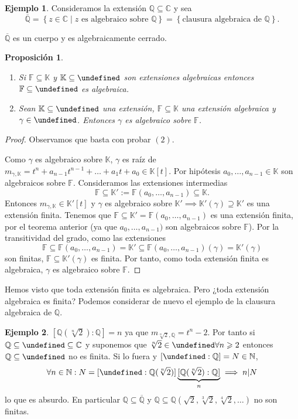 \documentclass[10pt, spanish]{report}
\newtheorem*{prop}{Proposición}
\theoremstyle{definition}
\newtheorem*{ej}{Ejemplo}
\newcommand{\N}{\mathbb{N}}
\newcommand{\Q}{\mathbb{Q}}
\newcommand{\C}{\mathbb{C}}
\newcommand{\F}{\mathbb{F}}
\newcommand{\K}{\mathbb{K}}
\let\L\undefined
\newcommand{\L}{\mathbb{L}}
\renewcommand{\geq}{\geqslant}
\newcommand{\fecha}[1]{\marginpar{\underline{#1}}}
\begin{document}
\begin{ej}
    Consideramos la extensión $\Q\subseteq\C$ y sea \[\overline{\Q}=\left\{ z\in
    \C\mid z\text{ es algebraico sobre }\Q\right\}=\left\{ \text{clausura
    algebraica de }\Q\right\}.\]

    $\overline{\Q}$ es un cuerpo y es algebraicamente cerrado.
\end{ej}

\fecha{2/03}
\begin{prop}\hspace{0pt}
    \begin{enumerate}
        \item Si $\F\subseteq\K$ y $\K\subseteq\L$ son extensiones algebraicas entonces
    $\F\subseteq\L$ es algebraica.
        \item Sean $\K\subseteq\L$ una extensión, $\F\subseteq\K$ una extensión
            algebraica y $\gamma\in\L$. Entonces $\gamma$ es algebraico sobre
            $\F$.
    \end{enumerate}
\end{prop}

\begin{proof}
        Observamos que basta con probar $(2)$.

        Como $\gamma$ es algebraico sobre $\K$, $\gamma$ es raíz de
        $m_{\gamma,\K}=t^n+a_{n-1}t^{n-1}+\ldots+a_1t+a_0\in\K[t]$. Por
        hipótesis $a_0,\ldots,a_{n-1}\in \K$ son algebraicos sobre $\F$.
        Consideramos las extensiones intermedias
        \[\F\subseteq\K':=\F(a_0,\ldots,a_{n-1})\subseteq\K.\]
        Entonces $m_{\gamma,\K}\in \K'[t]$ y $\gamma$  es
        algebraico sobre $\K' \implies \K'(\gamma)\supseteq \K'$ es una
        extensión finita. Tenemos que $\F\subseteq\K'=\F(a_0,\ldots,a_{n-1})$ es
        una extensión finita, por el teorema anterior (ya que
        $a_0,\ldots,a_{n-1})$ son algebraicos sobre $\F$). Por la transitividad
        del grado, como las extensiones
        \[\F\subseteq\F(a_0,\ldots,a_{n-1})=\K'\subseteq\F(a_0,\ldots,a_{n-1})(\gamma)=\K'(\gamma)\]
        son finitas, $\F\subseteq\K'(\gamma)$ es finita. Por tanto, como toda
        extensión finita es algebraica, $\gamma$ es algebraico sobre $\F$.
\end{proof}

Hemos visto que toda extensión finita es algebraica. Pero ¿toda extensión
algebraica es finita? Podemos considerar de nuevo el ejemplo de la clausura
algebraica de $\Q$.

\begin{ej}
    $[\Q(\sqrt[n]{2}):\Q]=n$ ya que $m_{\sqrt[n]{2} ,\Q}=t^n-2$. Por tanto si
    $\Q\subseteq\L\subseteq\C$ y suponemos que $\sqrt[n]{2}\in\L\forall n\geq2$
    entonces $\Q\subseteq\L$ no es finita. Si lo fuera y $[\L:\Q]=N\in\N$,
    \[\forall n\in \N: N=[\L:\Q(\sqrt[n]{2})]\underbrace{[\Q(\sqrt[n]{2}):
        \Q]}_{n}\implies n|N\] lo que es absurdo. En particular
        $\Q\subseteq\overline{\Q}$ y $\Q\subseteq\Q(\sqrt{2},\sqrt[3]{2},
        \sqrt[4]{2},\ldots)$ no son finitas.
\end{ej}
\end{document}
